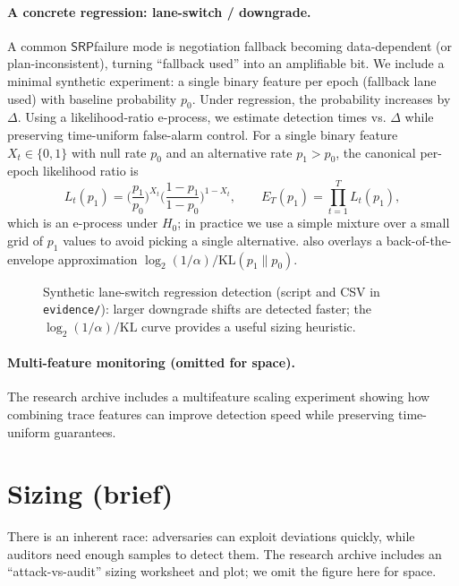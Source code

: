 \documentclass[11pt]{article}
\newcommand{\SRP}{\ensuremath{\mathsf{SRP}}}
\begin{document}
\paragraph{A concrete regression: lane-switch / downgrade.}
A common \SRP failure mode is negotiation fallback becoming data-dependent (or plan-inconsistent),
turning ``fallback used'' into an amplifiable bit.
We include a minimal synthetic experiment: a single binary feature per epoch (fallback lane used) with baseline probability $p_0$.
Under regression, the probability increases by $\Delta$.
Using a likelihood-ratio e-process, we estimate detection times vs. $\Delta$ while preserving time-uniform false-alarm control.
For a single binary feature $X_t\in\{0,1\}$ with null rate $p_0$ and an alternative rate $p_1>p_0$, the canonical per-epoch likelihood ratio is
\[L_t(p_1)=\Big(\frac{p_1}{p_0}\Big)^{X_t}\Big(\frac{1-p_1}{1-p_0}\Big)^{1-X_t},\qquad E_T(p_1)=\prod_{t=1}^{T} L_t(p_1),\]
which is an e-process under $H_0$; in practice we use a simple mixture over a small grid of $p_1$ values to avoid picking a single alternative.
 also overlays a back-of-the-envelope approximation
$\log_2(1/\alpha)/\mathrm{KL}(p_1\|p_0)$.

\begin{figure}[t]
  \centering
  \caption{Synthetic lane-switch regression detection (script and CSV in \texttt{evidence/}): larger downgrade shifts are detected faster; the $\log_2(1/\alpha)/\mathrm{KL}$ curve provides a useful sizing heuristic.}
  \label{fig:laneswitch}
\end{figure}

\paragraph{Multi-feature monitoring (omitted for space).}
The research archive includes a multifeature scaling experiment showing how combining trace features can improve detection speed while preserving time-uniform guarantees.


\section{Sizing (brief)}
There is an inherent race: adversaries can exploit deviations quickly, while auditors need enough samples to detect them.
The research archive includes an ``attack-vs-audit'' sizing worksheet and plot; we omit the figure here for space.
\end{document}
